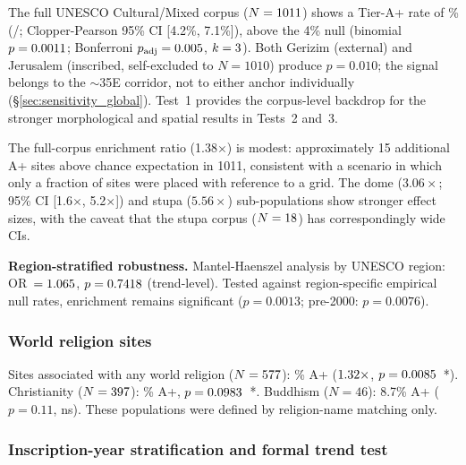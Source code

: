 \documentclass[12pt,a4paper]{article}
\begin{document}
The full UNESCO Cultural/Mixed corpus ($N = 1011$) shows a
Tier-A+ rate of \clusterApRate\%
(\NclusterAp/\NclusterTotal; Clopper-Pearson 95\% CI [4.2\%, 7.1\%]),
above the 4\% null
(binomial $p = 0.0011$; Bonferroni $p_\mathrm{adj} = 0.005$,
$k = 3$).
Both Gerizim (external) and Jerusalem (inscribed, self-excluded to
$N = 1010$) produce $p = 0.010$; the signal belongs to the
$\sim$35\textdegree{}E corridor, not to either anchor individually
(\S\ref{sec:sensitivity_global}).
Test~1 provides the corpus-level backdrop for the stronger morphological
and spatial results in Tests~2 and~3.

The full-corpus enrichment ratio (1.38$\times$) is modest: approximately
15 additional A+ sites above chance expectation in 1011, consistent with a
scenario in which only a fraction of sites were placed with reference to a
grid. The dome ($3.06\times$; 95\% CI [1.6$\times$, 5.2$\times$]) and stupa
($5.56\times$) sub-populations show stronger effect sizes, with the caveat
that the stupa corpus ($N = 18$) has correspondingly wide CIs.

\textbf{Region-stratified robustness.}
Mantel-Haenszel analysis by UNESCO region: OR~$= 1.065$,
$p = 0.7418$ (trend-level). Tested against region-specific empirical null
rates, enrichment remains significant ($p = 0.0013$; pre-2000: $p = 0.0076$).

\subsubsection*{World religion sites}

Sites associated with any world religion ($N = 577$): \religUnionApRate\%
A+ ($1.32\times$, $p = 0.0085$~*).
Christianity ($N = 397$): \christApRate\% A+, $p = 0.0983$~*.
Buddhism ($N = 46$): 8.7\% A+ ($p = 0.11$, ns).
These populations were defined by religion-name matching only.

\subsubsection*{Inscription-year stratification and formal trend test}
\label{sec:resultstemporal}
\end{document}

